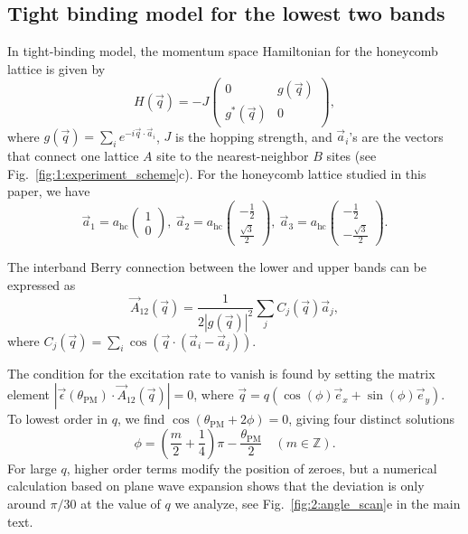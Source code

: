 \documentclass[superscriptaddress, reprint, amsmath, amssymb, aps, prl]{revtex4-2}
\begin{document}
\subsection{Tight binding model for the lowest two bands}\label{sec:tight_binding}
In tight-binding model, the momentum space Hamiltonian for the honeycomb lattice is given by
\begin{equation}
    H(\vec{q}) = -J
    \begin{pmatrix}
        0 & g(\vec{q})\\
        g^*(\vec{q}) & 0
    \end{pmatrix},
\end{equation}
where $g(\vec{q}) = \sum_i{e^{-i \vec{q} \cdot \vec{a}_i}}$, $J$ is the hopping strength, and $\vec{a}_i$'s are the vectors that connect one lattice $A$ site to the nearest-neighbor $B$ sites (see Fig.~\ref{fig:1:experiment_scheme}c). For the honeycomb lattice studied in this paper, we have
\begin{equation*}
    \vec{a}_1 = a_{\mathrm{hc}} \begin{pmatrix} 1 \\ 0 \end{pmatrix},\ 
    \vec{a}_2 = a_{\mathrm{hc}} \begin{pmatrix} - \frac{1}{2} \\ \frac{\sqrt{3}}{2} \end{pmatrix},\ 
    \vec{a}_3 = a_{\mathrm{hc}} \begin{pmatrix} - \frac{1}{2} \\ - \frac{\sqrt{3}}{2} \end{pmatrix}.
\end{equation*}

The interband Berry connection between the lower and upper bands can be expressed as
\begin{equation}
    \vec{A}_{12}(\vec{q}) = \frac{1}{2 |g(\vec{q})|^2} \sum_j{C_j(\vec{q}) \vec{a}_j},
\end{equation}
where $C_j(\vec{q}) = \sum_i \cos \left( \vec{q} \cdot (\vec{a}_i - \vec{a}_j) \right)$.

The condition for the excitation rate to vanish is found by setting the matrix element $|\vec{\epsilon}(\theta_\mathrm{PM}) \cdot \vec{A}_{12}(\vec{q})| = 0$, where
$\vec{q} = q (\cos(\phi) \vec{e}_x + \sin(\phi) \vec{e}_y)$. To lowest order in $q$, we find $\cos(\theta_\mathrm{PM} + 2 \phi) = 0$, giving four distinct solutions
\begin{equation}
    \phi = \left( \frac{m}{2} + \frac{1}{4} \right) \pi - \frac{\theta_\mathrm{PM}}{2} \quad
    (m \in \mathds{Z}).
\end{equation}
For large $q$, higher order terms modify the position of zeroes, but a numerical calculation based on plane wave expansion shows that the deviation is only around $\pi / 30$ at the value of $q$ we analyze, see Fig.~\ref{fig:2:angle_scan}e in the main text.
\end{document}

